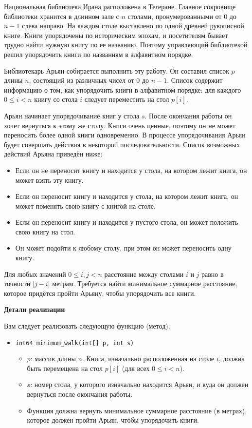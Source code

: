 Национальная библиотека Ирана расположена в Тегеране. Главное сокровище библиотеки
хранится в длинном зале с $n$ столами, пронумерованными от $0$ до $n-1$ слева направо. На
каждом столе выставлено по одной древней рукописной книге. Книги упорядочены по
историческим эпохам, и посетителям бывает трудно найти нужную книгу по ее названию.
Поэтому управляющий библиотекой решил упорядочить книги по названиям в алфавитном
порядке.

Библиотекарь Арьян собирается выполнить эту работу. Он составил список $p$ длины $n$,
состоящий из различных чисел от $0$ до $n-1$. Список содержит информацию о том, как
упорядочить книги в алфавитном порядке: для каждого $0 \le i < n$ книгу со стола $i$ следует переместить на стол $p[i]$.

Арьян начинает упорядочивание книг у стола $s$. После окончания работы он хочет вернуться к
этому же столу. Книги очень ценные, поэтому он не может переносить более одной книги
одновременно. В процессе упорядочивания Арьян будет совершать действия в некоторой
последовательности. Список возможных действий Арьяна приведён ниже:
\begin{itemize}
\item Если он не переносит книгу и находится у стола, на котором лежит книга, он может взять эту книгу.
\item Если он переносит книгу и находится у стола, на котором лежит книга, он может
поменять свою книгу с книгой на столе.
\item Если он переносит книгу и находится у пустого стола, он может положить свою книгу на
стол.
\item Он может подойти к любому столу, при этом он может переносить одну книгу.
\end{itemize}


Для любых значений $0 \le i, j < n$ расстояние между столами $i$ и $j$ равно в точности $|j-i|$ метрам. Требуется найти минимальное суммарное расстояние, которое придётся
пройти Арьяну, чтобы упорядочить все книги.

\textbf{Детали реализации }

Вам следует реализовать следующую функцию (метод):

\begin{itemize}
\item \texttt{int64 minimum\_walk(int[] p, int s)}
\begin{itemize}
\item $p$: массив длины $n$.
Книга, изначально расположенная на столе $i$, должна быть перемещена на стол $p[i]$ (для всех $0 \le i < n$).
\item $s$: номер стола, у которого изначально находится Арьян, и куда он должен вернуться после окончания работы.
\item Функция должна вернуть минимальное суммарное расстояние (в метрах), которое
должен пройти Арьян, чтобы упорядочить книги.
\end{itemize}
\end{itemize}
